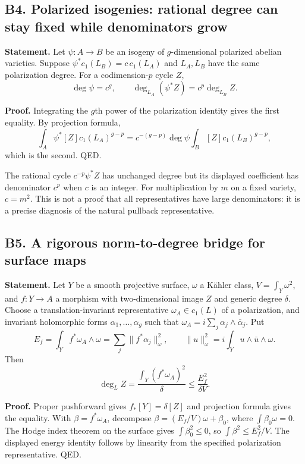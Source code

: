 \documentclass[11pt,a4paper]{article}
\theoremstyle{definition}
\begin{document}
\subsection{B4. Polarized isogenies: rational degree can stay fixed while denominators grow}\label{b4.-polarized-isogenies-rational-degree-can-stay-fixed-while-denominators-grow}

\textbf{Statement.} Let \(\psi:A\to B\) be an isogeny of \(g\)-dimensional polarized abelian varieties. Suppose \(\psi^*c_1(L_B)=c\,c_1(L_A)\) and \(L_A,L_B\) have the same polarization degree. For a codimension-\(p\) cycle \(Z\), \[
 \deg\psi=c^g,\qquad
 \deg_{L_A}(\psi^*Z)=c^p\deg_{L_B}Z.
\]

\textbf{Proof.} Integrating the \(g\)th power of the polarization identity gives the first equality. By projection formula, \[
 \int_A\psi^*[Z]c_1(L_A)^{g-p}
 =c^{-(g-p)}\deg\psi\int_B[Z]c_1(L_B)^{g-p},
\] which is the second. QED.

The rational cycle \(c^{-p}\psi^*Z\) has unchanged degree but its displayed coefficient has denominator \(c^p\) when \(c\) is an integer. For multiplication by \(m\) on a fixed variety, \(c=m^2\). This is not a proof that all representatives have large denominators: it is a precise diagnosis of the natural pullback representative.

\subsection{B5. A rigorous norm-to-degree bridge for surface maps}\label{b5.-a-rigorous-norm-to-degree-bridge-for-surface-maps}

\textbf{Statement.} Let \(Y\) be a smooth projective surface, \(\omega\) a Kähler class, \(V=\int_Y\omega^2\), and \(f:Y\to A\) a morphism with two-dimensional image \(Z\) and generic degree \(\delta\). Choose a translation-invariant representative \(\omega_A\in c_1(L)\) of a polarization, and invariant holomorphic forms \(\alpha_1,\ldots,\alpha_g\) such that \(\omega_A=i\sum_j\alpha_j\wedge\bar\alpha_j\). Put \[
 E_f=\int_Y f^*\omega_A\wedge\omega
 =\sum_j\|f^*\alpha_j\|_\omega^2,\qquad
 \|u\|_\omega^2=i\int_Yu\wedge\bar u\wedge\omega.
\] Then \[
 \deg_L Z=\frac{\int_Y(f^*\omega_A)^2}{\delta}
 \leq\frac{E_f^2}{\delta V}.
\]

\textbf{Proof.} Proper pushforward gives \(f_*[Y]=\delta[Z]\) and projection formula gives the equality. With \(\beta=f^*\omega_A\), decompose \(\beta=(E_f/V)\omega+\beta_0\), where \(\int\beta_0\omega=0\). The Hodge index theorem on the surface gives \(\int\beta_0^2\leq0\), so \(\int\beta^2\leq E_f^2/V\). The displayed energy identity follows by linearity from the specified polarization representative. QED.
\end{document}
